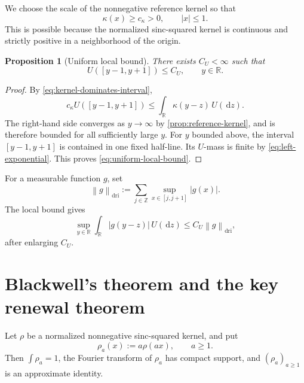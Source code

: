 \documentclass[10pt,reqno,a4paper]{amsart}
\numberwithin{equation}{section}
\theoremstyle{plain}
\newtheorem{proposition}[theorem]{Proposition}
\theoremstyle{definition}
\theoremstyle{remark}
\newcommand{\R}{\mathbb{R}}
\newcommand{\1}{\mathbf{1}}
\newcommand{\de}{\,\mathrm{d}}
\newcommand{\abs}[1]{\left|#1\right|}
\newcommand{\norm}[1]{\left\lVert#1\right\rVert}
\begin{document}
We choose the scale of the nonnegative reference kernel so that
\begin{equation}\label{eq:kernel-dominates-interval}
  \kappa(x)\geq c_\kappa>0,
  \qquad \abs x\leq1.
\end{equation}
This is possible because the normalized sinc-squared kernel is continuous and
strictly positive in a neighborhood of the origin.

\begin{proposition}[Uniform local bound]\label{prop:uniform-local-bound}
  There exists \(C_U<\infty\) such that
  \begin{equation}\label{eq:uniform-local-bound}
    U([y-1,y+1])\leq C_U,
    \qquad y\in\R.
  \end{equation}
\end{proposition}

\begin{proof}
  By \cref{eq:kernel-dominates-interval},
  \begin{equation*}
    c_\kappa U([y-1,y+1])
    \leq
    \int_\R\kappa(y-z)\,U(\de z).
  \end{equation*}
  The right-hand side converges as \(y\to\infty\) by
  \cref{prop:reference-kernel}, and is therefore bounded for all sufficiently
  large \(y\).  For \(y\) bounded above, the interval \([y-1,y+1]\) is
  contained in one fixed half-line.  Its \(U\)-mass is finite by
  \cref{eq:left-exponential}.  This proves \cref{eq:uniform-local-bound}.
\end{proof}

For a measurable function \(g\), set
\begin{equation}\label{eq:dri-norm}
  \norm{g}_{\mathrm{dri}}
  :=
  \sum_{j\in\mathbb Z}
  \sup_{x\in[j,j+1]}\abs{g(x)}.
\end{equation}
The local bound gives
\begin{equation}\label{eq:dri-convolution-bound}
  \sup_{y\in\R}
  \int_\R\abs{g(y-z)}\,U(\de z)
  \leq
  C_U\norm{g}_{\mathrm{dri}},
\end{equation}
after enlarging \(C_U\).

\section{Blackwell's theorem and the key renewal theorem}\label{sec:key-renewal}

Let \(\rho\) be a normalized nonnegative sinc-squared kernel, and put
\begin{equation}\label{eq:approximate-identity}
  \rho_a(x):=a\rho(ax),
  \qquad a\geq1.
\end{equation}
Then \(\int\rho_a=1\), the Fourier transform of \(\rho_a\) has compact
support, and \((\rho_a)_{a\geq1}\) is an approximate identity.
\end{document}
